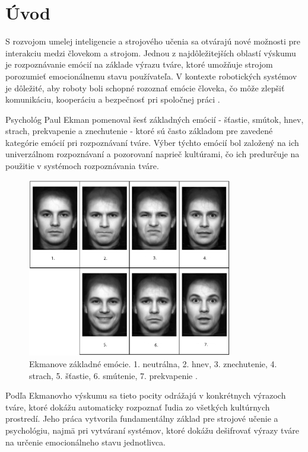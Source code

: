 \section{Úvod}
\label{sec:intro}
S rozvojom umelej inteligencie a strojového učenia sa otvárajú nové možnosti pre interakciu medzi človekom a strojom. Jednou z najdôležitejších oblastí výskumu je rozpoznávanie emócií na základe výrazu tváre, 
ktoré umožňuje strojom porozumieť emocionálnemu stavu používateľa. V kontexte robotických systémov je dôležité, aby roboty boli schopné rozoznať emócie človeka, čo môže zlepšiť komunikáciu, 
kooperáciu a bezpečnosť pri spoločnej práci \cite{article04}.

Psychológ Paul Ekman pomenoval šesť základných emócií - šťastie, smútok, hnev, strach, prekvapenie a znechutenie - ktoré sú často základom pre zavedené kategórie emócií pri rozpoznávaní tváre. 
Výber týchto emócií bol založený na ich univerzálnom rozpoznávaní a pozorovaní naprieč kultúrami, čo ich predurčuje na použitie v systémoch rozpoznávania tváre.
\begin{figure}[!htpb]
    \centering
    \includegraphics[width=0.8\textwidth]{img/emotions.png}
    \caption{Ekmanove základné emócie. 1. neutrálna, 2. hnev, 3. znechutenie, 4. strach, 5. šťastie, 6. smútenie, 7. prekvapenie \cite{figure_ekman}.} 
    \label{fig:ekman}
\end{figure}

Podľa Ekmanovho výskumu sa tieto pocity odrážajú v konkrétnych výrazoch tváre, ktoré dokážu automaticky rozpoznať ľudia zo všetkých kultúrnych prostredí. Jeho práca vytvorila fundamentálny základ 
pre strojové učenie a psychológiu, najmä pri vytváraní systémov, ktoré dokážu dešifrovať výrazy tváre na určenie emocionálneho stavu jednotlivca.


